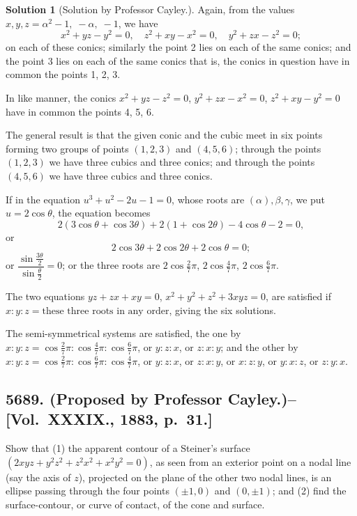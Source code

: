 \documentclass[11pt,a4paper]{article}
\theoremstyle{definition}
\newtheorem*{solution}{Solution}
\begin{document}
\begin{solution}[Solution by Professor Cayley.]
Again, from the values $x,y,z = \alpha^2-1, \; -\alpha, \; -1$, we have
\[
x^2+yz-y^2=0, \quad z^2+xy-x^2=0, \quad y^2+zx-z^2=0;
\]
on each of these conics; similarly the point 2 lies on each of the same conics; and the point 3 lies on each of the same conics that is, the conics in question have in common the points 1, 2, 3.

In like manner, the conics $x^2+yz-z^2=0$, $y^2+zx-x^2=0$, $z^2+xy-y^2=0$ have in common the points 4, 5, 6.

The general result is that the given conic and the cubic meet in six points forming two groups of points $(1,2,3)$ and $(4,5,6)$; through the points $(1,2,3)$ we have three cubics and three conics; and through the points $(4,5,6)$ we have three cubics and three conics.

If in the equation $u^3+u^2-2u-1=0$, whose roots are $(\alpha), \beta, \gamma$, we put $u=2\cos\theta$, the equation becomes
\[
2(3\cos\theta+\cos3\theta) + 2(1+\cos2\theta) - 4\cos\theta - 2 = 0,
\]
or
\[
2\cos3\theta + 2\cos2\theta + 2\cos\theta = 0;
\]
or $\dfrac{\sin\frac{3\theta}{2}}{\sin\frac{\theta}{2}} = 0$; or the three roots are $2\cos\frac{2}{7}\pi$, $2\cos\frac{4}{7}\pi$, $2\cos\frac{6}{7}\pi$.

The two equations $yz+zx+xy=0$, $x^2+y^2+z^2+3xyz=0$, are satisfied if $x:y:z = \text{these three roots in any order}$, giving the six solutions.

The semi-symmetrical systems are satisfied, the one by $x:y:z = \cos\frac{2}{7}\pi : \cos\frac{4}{7}\pi : \cos\frac{6}{7}\pi$, or $y:z:x$, or $z:x:y$; and the other by $x:y:z = \cos\frac{2}{7}\pi : \cos\frac{6}{7}\pi : \cos\frac{4}{7}\pi$, or $y:z:x$, or $z:x:y$, or $x:z:y$, or $y:x:z$, or $z:y:x$.
\end{solution}

\newpage

\subsection*{5689. (Proposed by Professor Cayley.)\---[Vol.~XXXIX., 1883, p.~31.]}

Show that (1) the apparent contour of a Steiner's surface $(2xyz+y^2z^2+z^2x^2+x^2y^2=0)$, as seen from an exterior point on a nodal line (say the axis of $z$), projected on the plane of the other two nodal lines, is an ellipse passing through the four points $(\pm1,0)$ and $(0,\pm1)$; and (2) find the surface-contour, or curve of contact, of the cone and surface.
\end{document}
